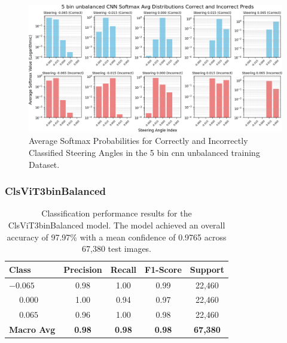 \begin{figure}[H]
    \centering
    \includegraphics[width=1\linewidth]{Figures/Results/5_bins_cnn_softmax_dist_plot_unbalanced.png}
    \caption{Average Softmax Probabilities for Correctly and Incorrectly Classified Steering Angles in the 5 bin cnn unbalanced training Dataset.}
    \label{fig:5_bins_cnn_softmax_dist_unbalanced}
\end{figure}


\subsubsection{ClsViT3binBalanced}

\begin{table}[htbp]
\centering
\begin{tabular}{@{}lcccc@{}}
\toprule
\textbf{Class} & \textbf{Precision} & \textbf{Recall} & \textbf{F1-Score} & \textbf{Support} \\
\midrule
$-0.065$ & 0.98 & 1.00 & 0.99 & 22,460 \\
$\phantom{-}0.000$ & 1.00 & 0.94 & 0.97 & 22,460 \\
$\phantom{-}0.065$ & 0.96 & 1.00 & 0.98 & 22,460 \\
\midrule
\textbf{Macro Avg} & \textbf{0.98} & \textbf{0.98} & \textbf{0.98} & \textbf{67,380} \\
\bottomrule
\end{tabular}
\caption{Classification performance results for the ClsViT3binBalanced model. The model achieved an overall accuracy of 97.97\% with a mean confidence of 0.9765 across 67,380 test images.}
\label{tab:clf_report_ClsViT3binBalanced}
\end{table}

